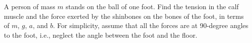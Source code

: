 A person of mass $m$ stands on the ball of one foot. Find
the tension in the calf muscle and the force exerted by the
shinbones on the bones of the foot, in terms of $m$, $g$, $a$, and $b$.
For simplicity, assume that all the forces are at 90-degree
angles to the foot, i.e., neglect the angle between the foot
and the floor.\answercheck
